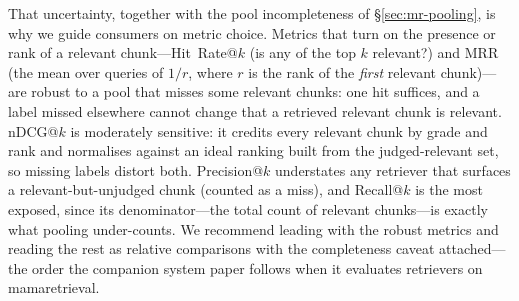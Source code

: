 That uncertainty, together with the pool incompleteness of
\S\ref{sec:mr-pooling}, is why we guide consumers on metric choice. Metrics that
turn on the presence or rank of a relevant chunk---Hit~Rate@$k$ (is any of the
top $k$ relevant?) and MRR (the mean over queries of $1/r$, where $r$ is the rank
of the \emph{first} relevant chunk)---are robust to a pool that misses some
relevant chunks: one hit suffices, and a label missed elsewhere cannot change
that a retrieved relevant chunk is relevant. nDCG@$k$ is
moderately sensitive: it credits every relevant chunk by grade and rank and
normalises against an ideal ranking built from the judged-relevant set, so
missing labels distort both. Precision@$k$ understates any retriever that
surfaces a relevant-but-unjudged chunk (counted as a miss), and Recall@$k$ is the
most exposed, since its denominator---the total count of relevant chunks---is
exactly what pooling under-counts. We recommend leading with the robust metrics
and reading the rest as relative comparisons with the completeness caveat
attached---the order the companion system paper follows when it evaluates
retrievers on mamaretrieval.
